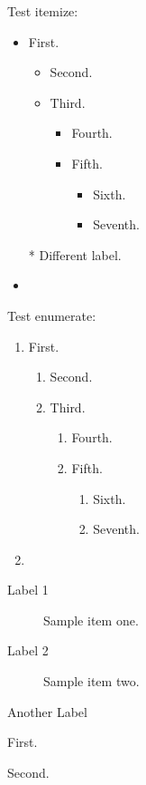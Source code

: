 \documentclass{article}
\begin{document}
Test itemize:
\begin{itemize}
\item First.
 \begin{itemize}
  \item Second.
  \item Third.
  \begin{itemize}
   \item Fourth.
   \item Fifth.
    \begin{itemize}
     \item Sixth.
     \item Seventh.
    \end{itemize}
  \end{itemize}
 \end{itemize}
\item[*] Different label.
\item \lipsum[1]
\end{itemize}

Test enumerate:
\begin{enumerate}
\item First.
 \begin{enumerate}
  \item Second.
  \item Third.
  \begin{enumerate}
   \item Fourth.
   \item Fifth.
    \begin{enumerate}
     \item Sixth.
     \item Seventh.
    \end{enumerate}
  \end{enumerate}
 \end{enumerate}
\item \lipsum[1]
\end{enumerate}

\begin{description}
\item[Label 1] Sample item one.
\item[Label 2] Sample item two.
\item[Another Label] \lipsum[1]
\end{description}

\begin{dinglist}{68}
\item First.
\item Second.
\end{dinglist}
\end{document}

